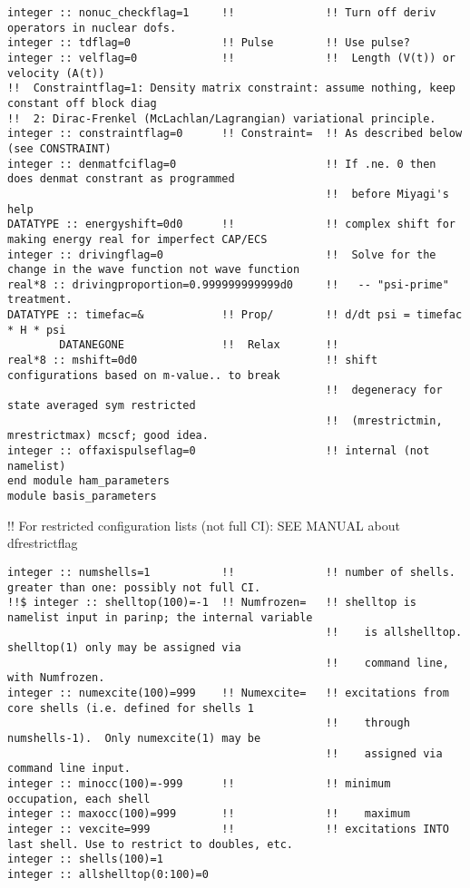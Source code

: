 \begin{verbatim}
integer :: nonuc_checkflag=1     !!              !! Turn off deriv operators in nuclear dofs.
integer :: tdflag=0              !! Pulse        !! Use pulse?
integer :: velflag=0             !!              !!  Length (V(t)) or velocity (A(t))      
!!  Constraintflag=1: Density matrix constraint: assume nothing, keep constant off block diag
!!  2: Dirac-Frenkel (McLachlan/Lagrangian) variational principle.
integer :: constraintflag=0      !! Constraint=  !! As described below (see CONSTRAINT)
integer :: denmatfciflag=0                       !! If .ne. 0 then does denmat constrant as programmed
                                                 !!  before Miyagi's help
DATATYPE :: energyshift=0d0      !!              !! complex shift for making energy real for imperfect CAP/ECS
integer :: drivingflag=0                         !!  Solve for the change in the wave function not wave function 
real*8 :: drivingproportion=0.999999999999d0     !!   -- "psi-prime" treatment.
DATATYPE :: timefac=&            !! Prop/        !! d/dt psi = timefac * H * psi
        DATANEGONE               !!  Relax       !!
real*8 :: mshift=0d0                             !! shift configurations based on m-value.. to break 
                                                 !!  degeneracy for state averaged sym restricted
                                                 !!  (mrestrictmin, mrestrictmax) mcscf; good idea.
integer :: offaxispulseflag=0                    !! internal (not namelist)
end module ham_parameters
module basis_parameters
\end{verbatim}
!! {\large \quad For restricted configuration lists (not full CI): SEE MANUAL about dfrestrictflag}
\begin{verbatim}
integer :: numshells=1           !!              !! number of shells.  greater than one: possibly not full CI. 
!!$ integer :: shelltop(100)=-1  !! Numfrozen=   !! shelltop is namelist input in parinp; the internal variable 
                                                 !!    is allshelltop.   shelltop(1) only may be assigned via 
                                                 !!    command line, with Numfrozen.
integer :: numexcite(100)=999    !! Numexcite=   !! excitations from core shells (i.e. defined for shells 1 
                                                 !!    through numshells-1).  Only numexcite(1) may be 
                                                 !!    assigned via command line input.
integer :: minocc(100)=-999      !!              !! minimum occupation, each shell
integer :: maxocc(100)=999       !!              !!    maximum
integer :: vexcite=999           !!              !! excitations INTO last shell. Use to restrict to doubles, etc.
integer :: shells(100)=1
integer :: allshelltop(0:100)=0           
\end{verbatim}
